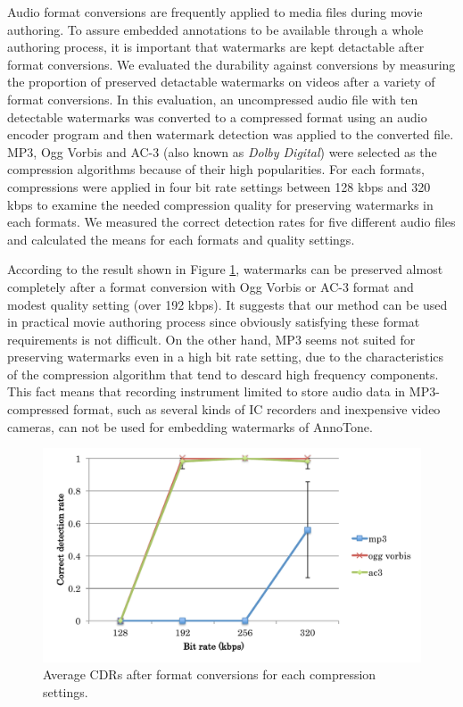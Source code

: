 Audio format conversions are frequently applied to media files during movie authoring.
To assure embedded annotations to be available through a whole authoring process, it is important that watermarks are kept detactable after format conversions.
We evaluated the durability against conversions by measuring the proportion of preserved detactable watermarks on videos after a variety of format conversions.
In this evaluation, an uncompressed audio file with ten detectable watermarks was converted to a compressed format using an audio encoder program and then watermark detection was applied to the converted file.
MP3, Ogg Vorbis and AC-3 (also known as {\it Dolby Digital}) were selected as the compression algorithms because of their high popularities.
For each formats, compressions were applied in four bit rate settings between 128 kbps and 320 kbps to examine the needed compression quality for preserving watermarks in each formats.
We measured the correct detection rates for five different audio files and calculated the means for each formats and quality settings.

According to the result shown in Figure \ref{fig:eval_conv}, watermarks can be preserved almost completely after a format conversion with Ogg Vorbis or AC-3 format and modest quality setting (over 192 kbps).
It suggests that our method can be used in practical movie authoring process since obviously satisfying these format requirements is not difficult.
On the other hand, MP3 seems not suited for preserving watermarks even in a high bit rate setting, due to the characteristics of the compression algorithm that tend to descard high frequency components.
This fact means that recording instrument limited to store audio data in MP3-compressed format, such as several kinds of IC recorders and inexpensive video cameras, can not be used for embedding watermarks of AnnoTone.

\begin{figure}[htbp]
 \begin{center}
  \includegraphics[width=120mm]{evaluation_conversion.pdf}
 \end{center}
 \caption{Average CDRs after format conversions for each compression settings.}
 \label{fig:eval_conv}
\end{figure}